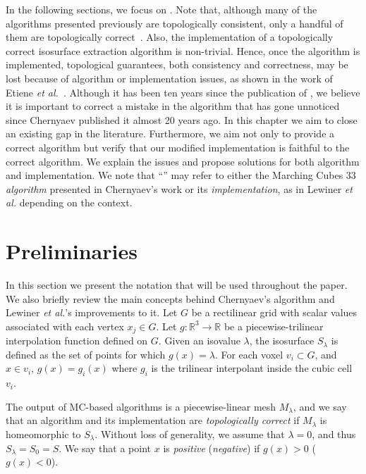 In the following sections, we focus on \mc{}. Note that, although many of the  algorithms presented previously are topologically consistent, only a handful of them are topologically correct~\cite{Chernyaev95marchingcubes, Dey07}. Also, the implementation of a topologically correct isosurface extraction algorithm is non-trivial.
Hence, once the algorithm is implemented, topological guarantees, both  consistency and correctness, may be lost because of algorithm or implementation issues, as shown in the work of Etiene \emph{et al.}~\cite{Etiene:2012:TVI:2197070.2197097}. 
%
Although it has been ten years since the publication of \mc{}, we believe it is important to correct a mistake in the algorithm that has gone unnoticed since Chernyaev published it almost 20 years ago. In this chapter we aim to close an existing gap in the \mc{} literature. Furthermore, we aim not only to provide a correct algorithm but verify that our modified implementation is faithful to the correct algorithm.  We explain the issues and propose solutions for both algorithm and implementation. 
%
We note that ``\mc{}'' may refer to either the Marching Cubes 33 \emph{algorithm} presented in Chernyaev's work \cite{Chernyaev95marchingcubes} or its \emph{implementation}, as in Lewiner \emph{et al.}  \cite{Lewiner:2003} depending on the context.


\section{Preliminaries}
\label{sec:preliminaries}

In this section we present the notation that will be used throughout the paper. We also briefly review the main concepts behind Chernyaev's algorithm and Lewiner \emph{et al.}'s improvements to it. 
%
Let $G$ be a rectilinear grid with scalar values associated with each vertex $x_j \in G$. Let $g:\mathbb{R}^3 \rightarrow \mathbb{R}$ be a piecewise-trilinear interpolation function defined on $G$. Given an isovalue $\lambda$,  the isosurface $S_\lambda$ is defined as the set of points for which $g(x)=\lambda$. For each voxel $v_i \subset G$, and $x \in v_i$, $g(x) = g_i(x)$ where $g_i$ is the trilinear interpolant inside the cubic cell $v_i$. 

The output of MC-based algorithms is a piecewise-linear mesh $M_\lambda$, and we say that an algorithm and its implementation are \emph{topologically correct} if $M_\lambda$ is homeomorphic to $S_\lambda$. Without loss of generality, we assume that $\lambda = 0$, and thus $S_\lambda = S_0 = S$. We say that a point $x$ is \emph{positive} (\emph{negative}) if $g(x) > 0$ ($g(x) < 0$). 

